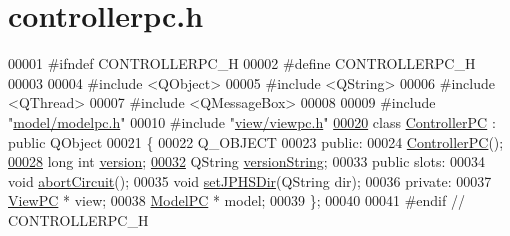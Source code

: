 \hypertarget{controllerpc_8h_source}{}\section{controllerpc.\+h}
\label{controllerpc_8h_source}

\begin{DoxyCode}
00001 \textcolor{preprocessor}{#ifndef CONTROLLERPC\_H}
00002 \textcolor{preprocessor}{#define CONTROLLERPC\_H}
00003 
00004 \textcolor{preprocessor}{#include <QObject>}
00005 \textcolor{preprocessor}{#include <QString>}
00006 \textcolor{preprocessor}{#include <QThread>}
00007 \textcolor{preprocessor}{#include <QMessageBox>}
00008 
00009 \textcolor{preprocessor}{#include "\hyperlink{modelpc_8h}{model/modelpc.h}"}
00010 \textcolor{preprocessor}{#include "\hyperlink{viewpc_8h}{view/viewpc.h}"}
\hypertarget{controllerpc_8h_source.tex_l00020}{}\hyperlink{class_controller_p_c}{00020} \textcolor{keyword}{class }\hyperlink{class_controller_p_c}{ControllerPC} : \textcolor{keyword}{public} QObject
00021 \{
00022     Q\_OBJECT
00023 \textcolor{keyword}{public}:
00024     \hyperlink{class_controller_p_c_afa6c92d67bf3b6531c42385fc5938003}{ControllerPC}();
\hypertarget{controllerpc_8h_source.tex_l00028}{}\hyperlink{class_controller_p_c_a9eb43c34237d66751a6411e55cf5f55e}{00028}     \textcolor{keywordtype}{long} \textcolor{keywordtype}{int} \hyperlink{class_controller_p_c_a9eb43c34237d66751a6411e55cf5f55e}{version};
\hypertarget{controllerpc_8h_source.tex_l00032}{}\hyperlink{class_controller_p_c_a0e63cca37d6ce2e660f3380400c2c5f3}{00032}     QString \hyperlink{class_controller_p_c_a0e63cca37d6ce2e660f3380400c2c5f3}{versionString};
00033 \textcolor{keyword}{public} slots:
00034     \textcolor{keywordtype}{void} \hyperlink{class_controller_p_c_a8814989f7be1214e06b2e720889066b0}{abortCircuit}();
00035     \textcolor{keywordtype}{void} \hyperlink{class_controller_p_c_ac00d29685a7e5b780c01eb438e10f96d}{setJPHSDir}(QString dir);
00036 \textcolor{keyword}{private}:
00037     \hyperlink{class_view_p_c}{ViewPC} * view;
00038     \hyperlink{class_model_p_c}{ModelPC} * model;
00039 \};
00040 
00041 \textcolor{preprocessor}{#endif // CONTROLLERPC\_H}
\end{DoxyCode}
